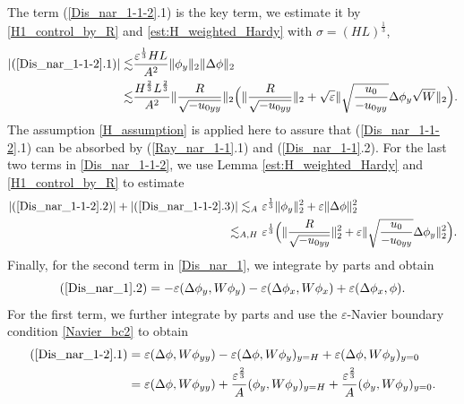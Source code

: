 \documentclass[reqno, 11pt]{amsart}
\theoremstyle{plain}
\theoremstyle{definition}
\theoremstyle{remark}
\numberwithin{equation}{section}
\begin{document}
The term (\ref{Dis_nar_1-1-2}.1) is the key term, we estimate it by  \eqref{H1_control_by_R} and \eqref{est:H_weighted_Hardy} with $\sigma = (HL)^{\frac{1}{3}}$,
\begin{equation}\label{Dis_nar_1-1-2-1}
\begin{aligned}
|(\ref{Dis_nar_1-1-2}.1)| \lesssim & \frac{\varepsilon^{\frac{1}{3}}HL}{A^2} \|\phi_y\|_2\| \Delta \phi\|_2\\
\lesssim & \frac{H^{\frac{2}{3}}L^{\frac{2}{3}}}{A^2}  \|\frac{R}{\sqrt{-u_{0yy}}}\|_2 \Big( \|\frac{R}{\sqrt{-u_{0yy}}}\|_2 + \sqrt\varepsilon \| \sqrt{\frac{u_0}{-u_{0yy}}} \Delta \phi_y \sqrt{W}\|_2\Big).
\end{aligned}
\end{equation}
The assumption \eqref{H_assumption} is applied here to assure that (\ref{Dis_nar_1-1-2}.1) can be absorbed by (\ref{Ray_nar_1-1}.1) and (\ref{Dis_nar_1-1}.2).
For the last two terms in \eqref{Dis_nar_1-1-2}, we use Lemma \eqref{est:H_weighted_Hardy} and \eqref{H1_control_by_R} to estimate
\begin{equation}\label{Dis_nar_1-1-2-2}
\begin{aligned}
|(\ref{Dis_nar_1-1-2}.2)| + |(\ref{Dis_nar_1-1-2}.3)| \lesssim_A &~ \varepsilon^{\frac{1}{3}}\| \phi_y\|_2^2 + \varepsilon \|\Delta \phi\|_2^2\\
\lesssim_{A,H} &~ \varepsilon^{\frac{1}{3}}  \Big( \|\frac{R}{\sqrt{-u_{0yy}}}\|_2^2 + \varepsilon \| \sqrt{\frac{u_0}{-u_{0yy}}} \Delta \phi_y\|_2^2\Big).
\end{aligned}
\end{equation}
Finally, for the second term in \eqref{Dis_nar_1}, we integrate by parts and obtain
\begin{equation}\label{Dis_nar_1-2}
(\ref{Dis_nar_1}.2) = - \varepsilon(\Delta \phi_y, W \phi_y) - \varepsilon(\Delta \phi_x, W \phi_x) + \varepsilon (\Delta \phi_x, \phi).
\end{equation}
For the first term, we further integrate by parts and use the $\varepsilon$-Navier boundary condition \eqref{Navier_bc2} to obtain 
\begin{equation}\label{Dis_nar_1-2-1}
\begin{aligned}
(\ref{Dis_nar_1-2}.1) &= \varepsilon(\Delta \phi, W \phi_{yy}) - \varepsilon (\Delta \phi, W \phi_y)_{y=H} + \varepsilon (\Delta \phi, W \phi_y)_{y = 0}\\
&= \varepsilon(\Delta \phi, W \phi_{yy}) + \frac{\varepsilon^{\frac{2}{3}}}{A} (\phi_y, W \phi_y)_{y = H} + \frac{\varepsilon^{\frac{2}{3}}}{A} (\phi_y, W \phi_y)_{y = 0}.
\end{aligned}
\end{equation}
\end{document}
